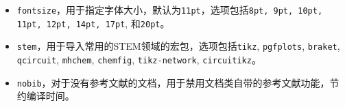 \begin{itemize}
\begin{enumerate}
        \item \texttt{booklet}：采用A5纸张、2厘米页边距的开本规格，适合制作小册子的文档，边距较窄，能够充分利用纸张空间。如果您想要制作一本大厚度 (100页或以上) 胶装本的“手边书”，可以考虑这个选项。
        \item \texttt{textbook}：采用B5纸张、2厘米页边距的开本规格，适合制作教科书的文档，边距适中，能够在保持内容清晰、足以容纳较长的数学公式和图例的同时提供足够的空白区域，提升阅读体验。
    \end{enumerate}
    \item \texttt{fontsize}，用于指定字体大小，默认为\texttt{11pt}，选项包括\texttt{8pt, 9pt, 10pt, 11pt, 12pt, 14pt, 17pt}, 和\texttt{20pt}。
    \item \texttt{stem}，用于导入常用的STEM领域的宏包，选项包括\texttt{tikz}, \texttt{pgfplots}, \texttt{braket}, \texttt{qcircuit}, \texttt{mhchem}, \texttt{chemfig}, \texttt{tikz-network}, \texttt{circuitikz}。
    \item \texttt{nobib}，对于没有参考文献的文档，用于禁用文档类自带的参考文献功能，节约编译时间。
\end{itemize}